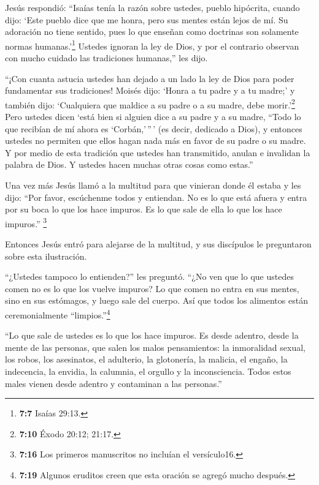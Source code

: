  Jesús respondió: ``Isaías tenía la razón sobre ustedes,
pueblo hipócrita, cuando dijo: `Este pueblo dice que me honra, pero sus
mentes están lejos de mí.  Su adoración no tiene sentido,
pues lo que enseñan como doctrinas son solamente normas
humanas.'\footnote{\textbf{7:7} Isaías 29:13.}  Ustedes
ignoran la ley de Dios, y por el contrario observan con mucho cuidado
las tradiciones humanas,'' les dijo.

 ``¡Con cuanta astucia ustedes han dejado a un lado la ley
de Dios para poder fundamentar sus tradiciones!  Moisés
dijo: `Honra a tu padre y a tu madre;' y también dijo: `Cualquiera que
maldice a su padre o a su madre, debe morir.'\footnote{\textbf{7:10}
  Éxodo 20:12; 21:17.}  Pero ustedes dicen `está bien si
alguien dice a su padre y a su madre, ``Todo lo que recibían de mí ahora
es `Corbán,'\,''\,' (es decir, dedicado a Dios),  y
entonces ustedes no permiten que ellos hagan nada más en favor de su
padre o su madre.  Y por medio de esta tradición que
ustedes han transmitido, anulan e invalidan la palabra de Dios. Y
ustedes hacen muchas otras cosas como estas.''

 Una vez más Jesús llamó a la multitud para que vinieran
donde él estaba y les dijo: ``Por favor, escúchenme todos y entiendan.
 No es lo que está afuera y entra por su boca lo que los
hace impuros. Es lo que sale de ella lo que los hace impuros.''
 \footnote{\textbf{7:16} Los primeros manuscritos no
  incluían el versículo16.}

 Entonces Jesús entró para alejarse de la multitud, y sus
discípulos le preguntaron sobre esta ilustración.

 ``¿Ustedes tampoco lo entienden?'' les preguntó. ``¿No ven
que lo que ustedes comen no es lo que los vuelve impuros? 
Lo que comen no entra en sus mentes, sino en sus estómagos, y luego sale
del cuerpo. Así que todos los alimentos están ceremonialmente
``limpios.''\footnote{\textbf{7:19} Algunos eruditos creen que esta
  oración se agregó mucho después.}

 ``Lo que sale de ustedes es lo que los hace impuros.
 Es desde adentro, desde la mente de las personas, que
salen los malos pensamientos: la inmoralidad sexual, los robos, los
asesinatos, el adulterio,  la glotonería, la malicia, el
engaño, la indecencia, la envidia, la calumnia, el orgullo y la
inconsciencia.  Todos estos males vienen desde adentro y
contaminan a las personas.''

